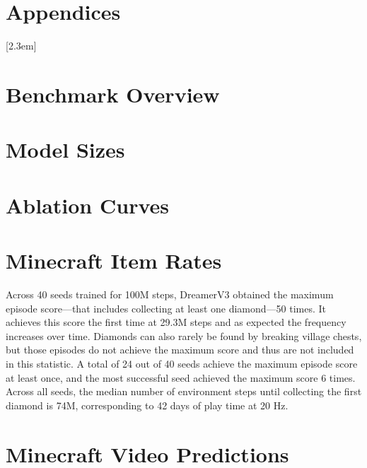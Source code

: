 \section*{Appendices}
\vspace{1.6ex}
[2.3em]{}{\contentslabel{2.3em}}{}{\contentspage}
\startcontents[sections]
\clearpage

\section{Benchmark Overview}

\section{Model Sizes}

\clearpage


\clearpage

\section{Ablation Curves}

\restoregeometry
\clearpage

\clearpage


\clearpage

\section{Minecraft Item Rates}

Across 40 seeds trained for 100M steps, DreamerV3 obtained the maximum episode score---that includes collecting at least one diamond---50 times. It achieves this score the first time at 29.3M steps and as expected the frequency increases over time. Diamonds can also rarely be found by breaking village chests, but those episodes do not achieve the maximum score and thus are not included in this statistic.
A total of 24 out of 40 seeds achieve the maximum episode score at least once, and the most successful seed achieved the maximum score 6 times. Across all seeds, the median number of environment steps until collecting the first diamond is 74M, corresponding to 42 days of play time at 20 Hz.


\clearpage

\section{Minecraft Video Predictions}
\label{sec:openl}

\restoregeometry
\clearpage

